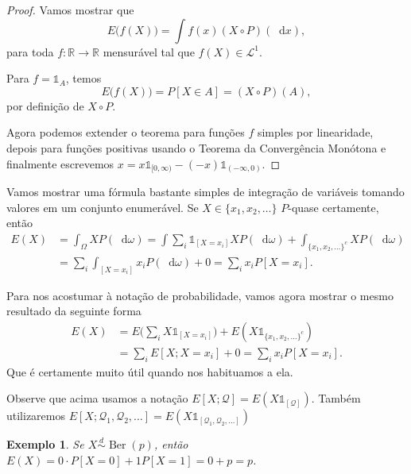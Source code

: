 \documentclass[reqno, final]{book}
\newcommand*\1{\mathds{1}}
\newtheorem{example}{Exemplo}[section]
\DeclareMathOperator{\Ber}{Ber}
\renewcommand*\d{\mathop{}\!\mathrm{d}}
\begin{document}
\begin{proof}
  Vamos mostrar que
  \begin{equation}
    E\big(f(X)\big) = \int f(x) (X \circ P) (\d x),
  \end{equation}
  para toda $f: \mathbb{R} \to \mathbb{R}$ mensurável tal que $f(X) \in \mathcal{L}^1$.

  Para $f = \1_A$, temos
  \begin{equation}
    E\big(f(X)\big) = P[X \in A] = (X \circ P) (A),
  \end{equation}
  por definição de $X \circ P$.

  Agora podemos extender o teorema para funções $f$ simples por linearidade, depois para funções positivas usando o Teorema da Convergência Monótona e finalmente escrevemos $x = x \1_{[0, \infty)} - (-x) \1_{(-\infty,0)}$.
\end{proof}

Vamos mostrar uma fórmula bastante simples de integração de variáveis tomando valores em um conjunto enumerável.
Se $X \in \{x_1, x_2, \dots\}$ $P$-quase certamente, então
\begin{equation}
  \begin{split}
    E(X) & = \int_\Omega X P(\d \omega) = \int \sum_i \1_{[X = x_i]} X P(\d \omega) + \int_{\{x_1, x_2, \dots\}^c} X P(\d \omega)\\
    & = \sum_i \int_{[X = x_i]} x_i P(\d \omega) + 0 = \sum_i x_i P[X = x_i].
  \end{split}
\end{equation}

Para nos acostumar à notação de probabilidade, vamos agora mostrar o mesmo resultado da seguinte forma
\begin{equation}
  \begin{split}
    E(X) & = E\Big(\sum_i X \1_{[X = x_i]}\Big) + E(X \1_{\{x_1, x_2, \dots\}^c})\\
    & = \sum_i E[X; X = x_i] + 0 = \sum_i x_i P[X = x_i].
  \end{split}
\end{equation}
Que é certamente muito útil quando nos habituamos a ela.

Observe que acima usamos a notação $E[X; \mathcal{Q}] = E(X \1_{[\mathcal{Q}]})$.
Também utilizaremos $E[X; \mathcal{Q}_1, \mathcal{Q}_2, \dots] = E(X \1_{[\mathcal{Q}_1, \mathcal{Q}_2, \dots]})$

\begin{example}
  Se $X \overset{d}\sim \Ber(p)$, então $E(X) = 0 \cdot P[X = 0] + 1 P[X = 1] = 0 + p = p$.
\end{example}
\end{document}
